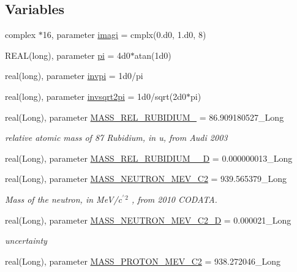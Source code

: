 \subsection*{Variables}
\begin{DoxyCompactItemize}
\item 
complex $\ast$16, parameter \hyperlink{namespacephys__cons_a0dbb22856790b16e206de451e9cdd74a}{imagi} = cmplx(0.d0, 1.d0, 8)
\item 
REAL(long), parameter \hyperlink{namespacephys__cons_aae3c6cb8ae765b0262bb110ff739ba9d}{pi} = 4d0$\ast$atan(1d0)
\item 
real(long), parameter \hyperlink{namespacephys__cons_aa8683f00f4216acc1822dfcb85b1ee00}{invpi} = 1d0/pi
\item 
real(long), parameter \hyperlink{namespacephys__cons_a369d33713444a99a71f80a74c0652d4e}{invsqrt2pi} = 1d0/sqrt(2d0$\ast$pi)
\item 
real(Long), parameter \hyperlink{namespacephys__cons_a41d46c36bfd57d8d6d1721791aa48ae2}{MASS\_\-REL\_\-RUBIDIUM\_} = 86.909180527\_\-Long
\begin{DoxyCompactList}\small\item\em relative atomic mass of 87 Rubidium, in u, from Audi 2003 \item\end{DoxyCompactList}\item 
real(Long), parameter \hyperlink{namespacephys__cons_afb707c156dff06d8cfcf41488ce7aeda}{MASS\_\-REL\_\-RUBIDIUM\_\_\-D} = 0.000000013\_\-Long
\item 
real(Long), parameter \hyperlink{namespacephys__cons_a9e80f5448f5f42cf9983890809e55d88}{MASS\_\-NEUTRON\_\-MEV\_\-C2} = 939.565379\_\-Long
\begin{DoxyCompactList}\small\item\em Mass of the neutron, in MeV/c$^{\mbox{$^\wedge$2}}$ , from 2010 CODATA. \item\end{DoxyCompactList}\item 
real(Long), parameter \hyperlink{namespacephys__cons_ab5fb46dc243eb307a344a134a593edd0}{MASS\_\-NEUTRON\_\-MEV\_\-C2\_\-D} = 0.000021\_\-Long
\begin{DoxyCompactList}\small\item\em uncertainty \item\end{DoxyCompactList}\item 
real(Long), parameter \hyperlink{namespacephys__cons_a3460d18828c87b266ab35b1cdeb4a0a5}{MASS\_\-PROTON\_\-MEV\_\-C2} = 938.272046\_\-Long

\end{DoxyCompactItemize}
